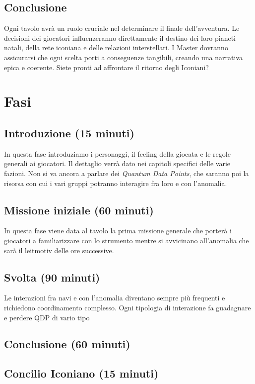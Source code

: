 \documentclass[letterpaper,twocolumn,openany,nodeprecatedcode]{dndbook}
\begin{document}
\section{Conclusione}

Ogni tavolo avrà un ruolo cruciale nel determinare il finale dell’avventura. Le decisioni dei giocatori influenzeranno direttamente il destino dei loro pianeti natali, della rete iconiana e delle relazioni interstellari. I Master dovranno assicurarsi che ogni scelta porti a conseguenze tangibili, creando una narrativa epica e coerente. Siete pronti ad affrontare il ritorno degli Iconiani?

\chapter {Fasi}
\section{Introduzione (15 minuti)}
In questa fase introduziamo i personaggi, il feeling della giocata e le regole generali ai giocatori. Il dettaglio verrà dato nei capitoli specifici delle varie fazioni. Non si va ancora a parlare dei \textit{Quantum Data Points}, che saranno poi la risorsa con cui i vari gruppi potranno interagire fra loro e con l'anomalia. 
\section {Missione iniziale (60 minuti)}
In questa fase viene data al tavolo la prima missione generale che porterà i giocatori a familiarizzare con lo strumento mentre si avvicinano all'anomalia che sarà il leitmotiv delle ore successive. 
\section {Svolta (90 minuti)}
Le interazioni fra navi e con l'anomalia diventano sempre più frequenti e richiedono coordinamento complesso. Ogni tipologia di interazione fa guadagnare e perdere QDP di vario tipo
\section {Conclusione (60 minuti)}

\section {Concilio Iconiano (15 minuti)}
\end{document}
